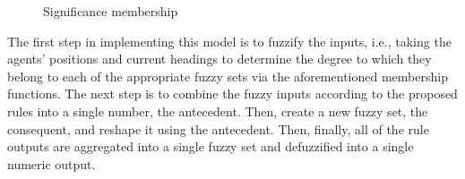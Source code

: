 \documentclass[9pt]{pnas-new}
\begin{document}
\begin{figure}[h]
\begin{minipage}{0.32\textwidth}
    \caption{\label{fig:significance_membership}Significance membership}
    \label{img_3456}
  \end{minipage}%
\end{figure}

The first step in implementing this model is to fuzzify the inputs, i.e., taking the agents' positions and current headings to determine the degree to which they belong to each of the appropriate fuzzy sets via the aforementioned membership functions.
The next step is to combine the fuzzy inputs according to the proposed rules into a single number, the antecedent. Then, create a new fuzzy set, the consequent, and reshape it using the antecedent.
Then, finally, all of the rule outputs are aggregated into a single fuzzy set and defuzzified into a single numeric output.

\end{document}
